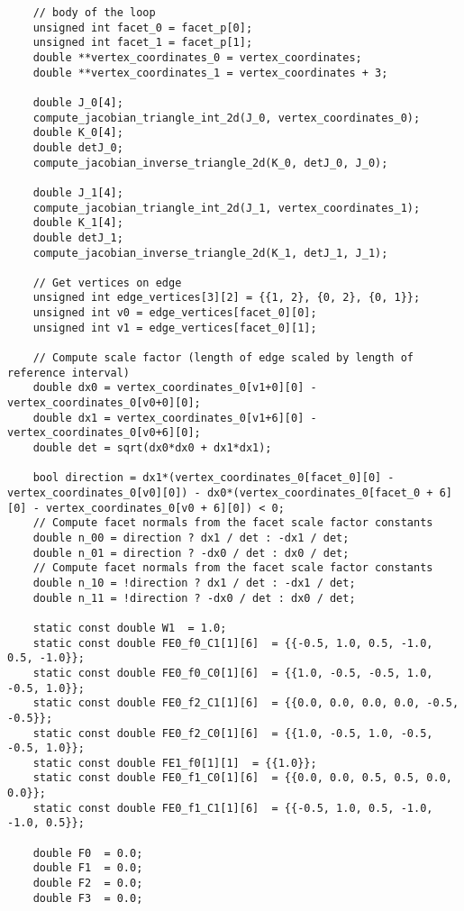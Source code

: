 \documentclass[a4paper]{article}
\begin{document}
\begin{appendices}
\begin{lstlisting}
    // body of the loop
    unsigned int facet_0 = facet_p[0];
    unsigned int facet_1 = facet_p[1];
    double **vertex_coordinates_0 = vertex_coordinates;
    double **vertex_coordinates_1 = vertex_coordinates + 3;

    double J_0[4];
    compute_jacobian_triangle_int_2d(J_0, vertex_coordinates_0);
    double K_0[4];
    double detJ_0;
    compute_jacobian_inverse_triangle_2d(K_0, detJ_0, J_0);

    double J_1[4];
    compute_jacobian_triangle_int_2d(J_1, vertex_coordinates_1);
    double K_1[4];
    double detJ_1;
    compute_jacobian_inverse_triangle_2d(K_1, detJ_1, J_1);

    // Get vertices on edge
    unsigned int edge_vertices[3][2] = {{1, 2}, {0, 2}, {0, 1}};
    unsigned int v0 = edge_vertices[facet_0][0];
    unsigned int v1 = edge_vertices[facet_0][1];

    // Compute scale factor (length of edge scaled by length of reference interval)
    double dx0 = vertex_coordinates_0[v1+0][0] - vertex_coordinates_0[v0+0][0];
    double dx1 = vertex_coordinates_0[v1+6][0] - vertex_coordinates_0[v0+6][0];
    double det = sqrt(dx0*dx0 + dx1*dx1);

    bool direction = dx1*(vertex_coordinates_0[facet_0][0] - vertex_coordinates_0[v0][0]) - dx0*(vertex_coordinates_0[facet_0 + 6][0] - vertex_coordinates_0[v0 + 6][0]) < 0;
    // Compute facet normals from the facet scale factor constants
    double n_00 = direction ? dx1 / det : -dx1 / det;
    double n_01 = direction ? -dx0 / det : dx0 / det;
    // Compute facet normals from the facet scale factor constants
    double n_10 = !direction ? dx1 / det : -dx1 / det;
    double n_11 = !direction ? -dx0 / det : dx0 / det;
 
    static const double W1  = 1.0;  
    static const double FE0_f0_C1[1][6]  = {{-0.5, 1.0, 0.5, -1.0, 0.5, -1.0}};  
    static const double FE0_f0_C0[1][6]  = {{1.0, -0.5, -0.5, 1.0, -0.5, 1.0}};  
    static const double FE0_f2_C1[1][6]  = {{0.0, 0.0, 0.0, 0.0, -0.5, -0.5}};  
    static const double FE0_f2_C0[1][6]  = {{1.0, -0.5, 1.0, -0.5, -0.5, 1.0}};  
    static const double FE1_f0[1][1]  = {{1.0}};  
    static const double FE0_f1_C0[1][6]  = {{0.0, 0.0, 0.5, 0.5, 0.0, 0.0}};  
    static const double FE0_f1_C1[1][6]  = {{-0.5, 1.0, 0.5, -1.0, -1.0, 0.5}};

    double F0  = 0.0;
    double F1  = 0.0;
    double F2  = 0.0;
    double F3  = 0.0;


\end{lstlisting}
\end{appendices}
\end{document}
